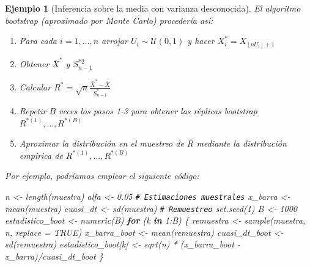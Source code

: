 \documentclass[
  10pt,
]{book}
\newenvironment{Shaded}{\begin{snugshade}}{\end{snugshade}}
\newcommand{\AttributeTok}[1]{\textcolor[rgb]{0.77,0.63,0.00}{#1}}
\newcommand{\CommentTok}[1]{\textcolor[rgb]{0.56,0.35,0.01}{\textit{#1}}}
\newcommand{\ConstantTok}[1]{\textcolor[rgb]{0.00,0.00,0.00}{#1}}
\newcommand{\ControlFlowTok}[1]{\textcolor[rgb]{0.13,0.29,0.53}{\textbf{#1}}}
\newcommand{\DecValTok}[1]{\textcolor[rgb]{0.00,0.00,0.81}{#1}}
\newcommand{\FloatTok}[1]{\textcolor[rgb]{0.00,0.00,0.81}{#1}}
\newcommand{\FunctionTok}[1]{\textcolor[rgb]{0.00,0.00,0.00}{#1}}
\newcommand{\NormalTok}[1]{#1}
\newcommand{\OtherTok}[1]{\textcolor[rgb]{0.56,0.35,0.01}{#1}}
\newcommand{\SpecialCharTok}[1]{\textcolor[rgb]{0.00,0.00,0.00}{#1}}
\theoremstyle{break}
\newtheorem{example}{Ejemplo}[chapter]
\theoremstyle{nonumberplain}
\renewcommand{\CommentTok}[1]{\textcolor[rgb]{0.41,0.41,0.41}{\texttt{#1}}}
\begin{document}
\begin{example}[Inferencia sobre la media con varianza desconocida]
El algoritmo bootstrap (aproximado por Monte Carlo) procedería así:

\begin{enumerate}
\def\labelenumi{\arabic{enumi}.}
\item
  Para cada \(i=1,\ldots ,n\) arrojar \(U_i\sim \mathcal{U}\left( 0,1 \right)\) y
  hacer \(X_i^{\ast}=X_{\left\lfloor nU_i\right\rfloor +1}\)
\item
  Obtener \(\bar{X}^{\ast}\) y \(S_{n-1}^{\ast 2}\)
\item
  Calcular
  \(R^{\ast}=\sqrt{n}\frac{\bar{X}^{\ast}-\bar{X}}{ S_{n-1}^{\ast}}\)
\item
  Repetir \(B\) veces los pasos 1-3 para obtener las réplicas bootstrap
  \(R^{\ast (1)}, \ldots, R^{\ast (B)}\)
\item
  Aproximar la distribución en el muestreo de \(R\) mediante la
  distribución empírica de \(R^{\ast (1)}, \ldots, R^{\ast (B)}\)
\end{enumerate}

Por ejemplo, podríamos emplear el siguiente código:

\begin{Shaded}
\begin{Highlighting}[]
\NormalTok{n }\OtherTok{\textless{}{-}} \FunctionTok{length}\NormalTok{(muestra)}
\NormalTok{alfa }\OtherTok{\textless{}{-}} \FloatTok{0.05}
\CommentTok{\# Estimaciones muestrales}
\NormalTok{x\_barra }\OtherTok{\textless{}{-}} \FunctionTok{mean}\NormalTok{(muestra)}
\NormalTok{cuasi\_dt }\OtherTok{\textless{}{-}} \FunctionTok{sd}\NormalTok{(muestra)}
\CommentTok{\# Remuestreo}
\FunctionTok{set.seed}\NormalTok{(}\DecValTok{1}\NormalTok{)}
\NormalTok{B }\OtherTok{\textless{}{-}} \DecValTok{1000}
\NormalTok{estadistico\_boot }\OtherTok{\textless{}{-}} \FunctionTok{numeric}\NormalTok{(B)}
\ControlFlowTok{for}\NormalTok{ (k }\ControlFlowTok{in} \DecValTok{1}\SpecialCharTok{:}\NormalTok{B) \{}
\NormalTok{  remuestra }\OtherTok{\textless{}{-}} \FunctionTok{sample}\NormalTok{(muestra, n, }\AttributeTok{replace =} \ConstantTok{TRUE}\NormalTok{)}
\NormalTok{  x\_barra\_boot }\OtherTok{\textless{}{-}} \FunctionTok{mean}\NormalTok{(remuestra)}
\NormalTok{  cuasi\_dt\_boot }\OtherTok{\textless{}{-}} \FunctionTok{sd}\NormalTok{(remuestra)}
\NormalTok{  estadistico\_boot[k] }\OtherTok{\textless{}{-}} \FunctionTok{sqrt}\NormalTok{(n) }\SpecialCharTok{*}\NormalTok{ (x\_barra\_boot }\SpecialCharTok{{-}}\NormalTok{ x\_barra)}\SpecialCharTok{/}\NormalTok{cuasi\_dt\_boot}
\NormalTok{\}}
\end{Highlighting}
\end{Shaded}


\end{example}
\end{document}
